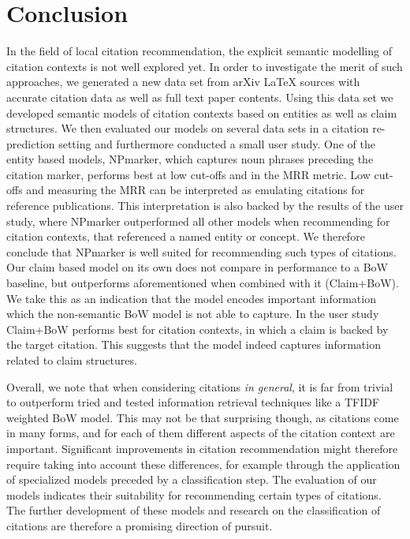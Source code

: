 \chapter{Conclusion}\label{chap:conclusion}
In the field of local citation recommendation, the explicit semantic modelling of citation contexts is not well explored yet. In order to investigate the merit of such approaches, we generated a new data set from arXiv \LaTeX{} sources with accurate citation data as well as full text paper contents. Using this data set we developed semantic models of citation contexts based on entities as well as claim structures. We then evaluated our models on several data sets in a citation re-prediction setting and furthermore conducted a small user study. One of the entity based models, NPmarker, which captures noun phrases preceding the citation marker, performs best at low cut-offs and in the MRR metric. Low cut-offs and measuring the MRR can be interpreted as emulating citations for reference publications. This interpretation is also backed by the results of the user study, where NPmarker outperformed all other models when recommending for citation contexts, that referenced a named entity or concept. We therefore conclude that NPmarker is well suited for recommending such types of citations. Our claim based model on its own does not compare in performance to a BoW baseline, but outperforms aforementioned when combined with it (Claim+BoW). We take this as an indication that the model encodes important information which the non-semantic BoW model is not able to capture. In the user study Claim+BoW performs best for citation contexts, in which a claim is backed by the target citation. This suggests that the model indeed captures information related to claim structures.

Overall, we note that when considering citations \emph{in general}, it is far from trivial to outperform tried and tested information retrieval techniques like a TFIDF weighted BoW model. This may not be that surprising though, as citations come in many forms, and for each of them different aspects of the citation context are important. Significant improvements in citation recommendation might therefore require taking into account these differences, for example through the application of specialized models preceded by a classification step. The evaluation of our models indicates their suitability for recommending certain types of citations. The further development of these models and research on the classification of citations are therefore a promising direction of pursuit.
